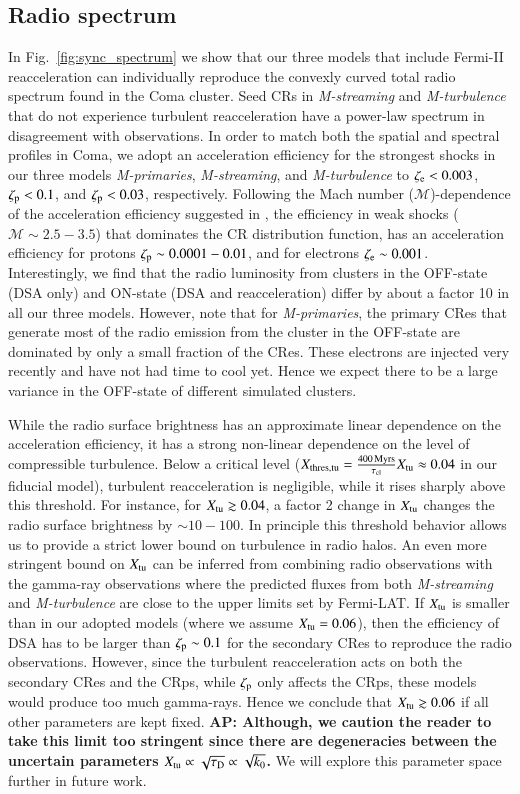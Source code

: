 \documentclass[useAMS,usenatbib]{mn2e}
\newcommand{\Mstream}{{\it M-streaming}\xspace}
\newcommand{\Mflatturb}{{\it M-turbulence}\xspace}
\newcommand{\Mprimary}{{\it M-primaries}\xspace}
\def\AP#1{{\bf  AP: #1}}
\begin{document}
\subsection{Radio spectrum}
In Fig.~\ref{fig:sync_spectrum} we show that our three models that
include Fermi-II reacceleration can individually reproduce the
convexly curved total radio spectrum found in the Coma cluster. Seed
CRs in \Mstream and \Mflatturb that do not experience turbulent
reacceleration have a power-law spectrum in disagreement with
observations. In order to match both the spatial and spectral profiles
in Coma, we adopt an acceleration efficiency for the strongest shocks
in our three models \Mprimary, \Mstream, and \Mflatturb to
$\zeta_{{\mathrm{e}}} <0.003$, $\zeta_{{\mathrm{p}}} < 0.1$, and
$\zeta_{{\mathrm{p}}}<0.03$, respectively. Following the Mach number
($\mathcal{M}$)-dependence of the acceleration efficiency suggested in
\cite{pinzke13}, the efficiency in weak shocks ($\mathcal{M}\sim
2.5-3.5$) that dominates the CR distribution function, has an
acceleration efficiency for protons $\zeta_{{\mathrm{p}}}\sim0.0001-0.01$,
and for electrons $\zeta_{{\mathrm{e}}}\sim 0.001$. Interestingly, we find
that the radio luminosity from clusters in the OFF-state (DSA only)
and ON-state (DSA and reacceleration) differ by about a factor 10 in
all our three models. However, note that for \Mprimary, the primary
CRes that generate most of the radio emission from the cluster in the
OFF-state are dominated by only a small fraction of the CRes. These
electrons are injected very recently and have not had time to cool
yet. Hence we expect there to be a large variance in the OFF-state of
different simulated clusters.

While the radio surface brightness has an approximate linear
dependence on the acceleration efficiency, it has a strong non-linear
dependence on the level of compressible turbulence. Below a critical
level ($X_{\mathrm{thres,tu}} = 
\frac{400\,{\mathrm{Myrs}}}{\tau_{\mathrm{cl}}} X_{\mathrm{tu}}\approx 0.04$ in our fiducial model),
turbulent reacceleration is negligible, while it rises sharply above
this threshold. For instance, for $X_{\mathrm{tu}}\gtrsim0.04$, a factor 2 change
in $X_{\mathrm{tu}}$ changes the radio surface brightness by $\sim
10-100$. In principle this threshold behavior allows us to provide a
strict lower bound on turbulence in radio halos. An even more
stringent bound on $X_{\mathrm{tu}}$ can be inferred from combining radio
observations with the gamma-ray observations where the predicted
fluxes from both \Mstream and \Mflatturb are close to the upper limits
set by Fermi-LAT. If $X_{\mathrm{tu}}$ is smaller than in our adopted
models (where we assume $X_{\mathrm{tu}}=0.06$), then the efficiency of DSA
has to be larger than $\zeta_{\mathrm{p}}\sim 0.1$ for the secondary CRes
to reproduce the radio observations. However, since the turbulent
reacceleration acts on both the secondary CRes and the CRps, while
$\zeta_{\mathrm{p}}$ only affects the CRps, these models would produce too
much gamma-rays. Hence we conclude that $X_{\mathrm{tu}}\gtrsim0.06$ if all
other parameters are kept fixed. \AP{Although, we caution the reader
  to take this limit too stringent since there are degeneracies between
  the uncertain parameters
  $X_{\mathrm{tu}}\propto\sqrt{\tau_{\mathrm{D}}}\propto \sqrt{k_0}$.} We will
explore this parameter space further in future work.
\end{document}
